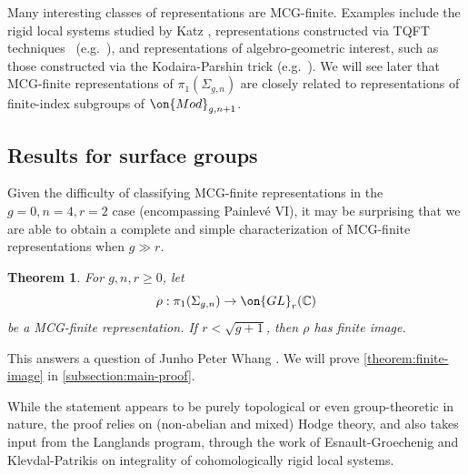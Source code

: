 \documentclass[12 pt]{amsart}
\theoremstyle{plain}
\newtheorem{theorem}[subsubsection]{Theorem}
\theoremstyle{definition}
\theoremstyle{remark}
\numberwithin{equation}{section}
\begin{document}
Many interesting classes of
representations are MCG-finite.
Examples include 
the rigid local systems studied by Katz \cite{katz2016rigid}, 
representations constructed via TQFT techniques ~(e.g.~\cite{kuperberg2011denseness, koberda2016quotients, koberda2018irreducibility, koberda2018representation}),
and representations of algebro-geometric interest, such as those constructed via the Kodaira-Parshin trick (e.g.~\cite[Example 3.3.1]{lawrence2019representations}).
We will see later that MCG-finite representations of $\pi_1(\Sigma_{g,n})$ are closely related to representations of finite-index subgroups of $\on{Mod}_{g,n+1}$. 



\subsection{Results for surface groups}
\label{subsection:surface-groups}
Given the difficulty of classifying MCG-finite representations in the $g = 0, n = 4, r = 2$ case (encompassing Painlev\'e VI), it may be surprising that
 we are able to obtain a complete and simple characterization of MCG-finite representations when 
$g \gg r$.

\begin{theorem}\label{theorem:finite-image}
	For $g, n, r\geq 0$, let
	$$\rho: \pi_1(\Sigma_{g,n})\to \on{GL}_r(\mathbb{C})$$ be a MCG-finite
representation. If $r<\sqrt{g+1}$, then $\rho$ has finite image. 
\end{theorem}
	This answers a question of Junho Peter Whang \cite[Question
	1.5.3]{lawrence2019representations}. We will prove
	\autoref{theorem:finite-image} in
\autoref{subsection:main-proof}.
	
	While the statement appears to be purely topological or even group-theoretic in nature, the proof relies on (non-abelian and mixed) Hodge theory, and also takes input from the Langlands program, through the work of Esnault-Groechenig \cite{esnault2018cohomologically} 
and Klevdal-Patrikis \cite{klevdalP:g-rigid-local-systems-are-integral}
on integrality of cohomologically rigid local systems.
	
\end{document}
